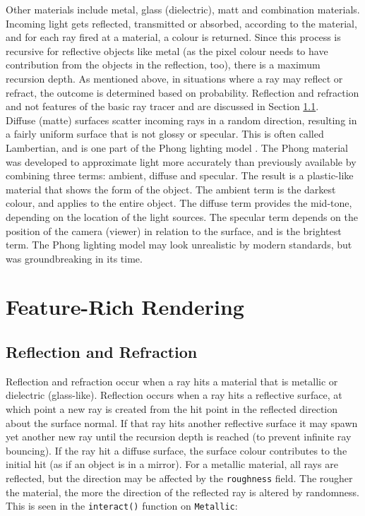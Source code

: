 \documentclass[a4paper]{article}
\begin{document}
Other materials include metal, glass (dielectric), matt and combination materials. Incoming light gets reflected, transmitted or absorbed, according to the material, and for each ray fired at a material, a colour is returned. Since this process is recursive for reflective objects like metal (as the pixel colour needs to have contribution from the objects in the reflection, too), there is a maximum recursion depth. As mentioned above, in situations where a ray may reflect or refract, the outcome is determined based on probability. Reflection and refraction and not features of the basic ray tracer and are discussed in Section \ref{ss:reflandrefr}.\\

Diffuse (matte) surfaces scatter incoming rays in a random direction, resulting in a fairly uniform surface that is not glossy or specular. This is often called Lambertian, and is one part of the Phong lighting model \cite{Phong1975lighting}. The Phong material was developed to approximate light more accurately than previously available by combining three terms: ambient, diffuse and specular. The result is a plastic-like material that shows the form of the object. The ambient term is the darkest colour, and applies to the entire object. The diffuse term provides the mid-tone, depending on the location of the light sources. The specular term depends on the position of the camera (viewer) in relation to the surface, and is the brightest term. The Phong lighting model may look unrealistic by modern standards, but was groundbreaking in its time.\\

\section{Feature-Rich Rendering}
\subsection{Reflection and Refraction}\label{ss:reflandrefr}
Reflection and refraction occur when a ray hits a material that is metallic or dielectric (glass-like). Reflection occurs when a ray hits a reflective surface, at which point a new ray is created from the hit point in the reflected direction about the surface normal. If that ray hits another reflective surface it may spawn yet another new ray until the recursion depth is reached (to prevent infinite ray bouncing). If the ray hit a diffuse surface, the surface colour contributes to the initial hit (as if an object is in a mirror). For a metallic material, all rays are reflected, but the direction may be affected by the \texttt{roughness} field. The rougher the material, the more the direction of the reflected ray is altered by randomness. This is seen  in the \texttt{interact()} function on \texttt{Metallic}:
\end{document}
